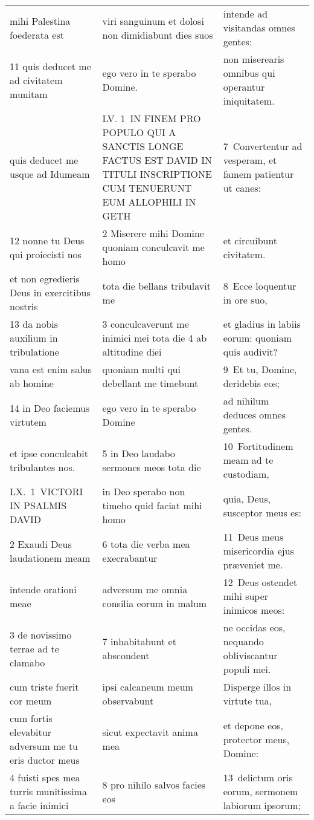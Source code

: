 \documentclass{article}
\begin{document}
\begin{longtable}{@{}p{}p{}p{}@{}}
mihi Palestina foederata est	&	viri sanguinum et dolosi non dimidiabunt dies suos	&	intende ad visitandas omnes gentes:	\\
11 quis deducet me ad civitatem munitam	&	ego vero in te sperabo Domine.	&	non miserearis omnibus qui operantur iniquitatem.	\\
quis deducet me usque ad Idumeam	&	LV. 1 IN FINEM PRO POPULO QUI A SANCTIS LONGE FACTUS EST DAVID IN TITULI INSCRIPTIONE CUM TENUERUNT EUM ALLOPHILI IN GETH	&	7 Convertentur ad vesperam, et famem patientur ut canes:	\\
12 nonne tu Deus qui proiecisti nos	&	2 Miserere mihi Domine quoniam conculcavit me homo	&	et circuibunt civitatem.	\\
et non egredieris Deus in exercitibus nostris	&	tota die bellans tribulavit me	&	8 Ecce loquentur in ore suo,	\\
13 da nobis auxilium in tribulatione	&	3 conculcaverunt me inimici mei tota die 4 ab altitudine diei	&	et gladius in labiis eorum: quoniam quis audivit?	\\
vana est enim salus ab homine	&	quoniam multi qui debellant me timebunt	&	9 Et tu, Domine, deridebis eos;	\\
14 in Deo faciemus virtutem	&	ego vero in te sperabo Domine	&	ad nihilum deduces omnes gentes.	\\
et ipse conculcabit tribulantes nos.	&	5 in Deo laudabo sermones meos tota die	&	10 Fortitudinem meam ad te custodiam,	\\
LX. 1 VICTORI IN PSALMIS DAVID	&	in Deo sperabo non timebo quid faciat mihi homo	&	quia, Deus, susceptor meus es:	\\
2 Exaudi Deus laudationem meam	&	6 tota die verba mea execrabantur	&	11 Deus meus misericordia ejus præveniet me.	\\
intende orationi meae	&	adversum me omnia consilia eorum in malum	&	12 Deus ostendet mihi super inimicos meos:	\\
3 de novissimo terrae ad te clamabo	&	7 inhabitabunt et abscondent	&	ne occidas eos, nequando obliviscantur populi mei.	\\
cum triste fuerit cor meum	&	ipsi calcaneum meum observabunt	&	Disperge illos in virtute tua,	\\
cum fortis elevabitur adversum me tu eris ductor meus	&	sicut expectavit anima mea	&	et depone eos, protector meus, Domine:	\\
4 fuisti spes mea turris munitissima a facie inimici	&	8 pro nihilo salvos facies eos	&	13 delictum oris eorum, sermonem labiorum ipsorum;	\\

\end{longtable}
\end{document}
